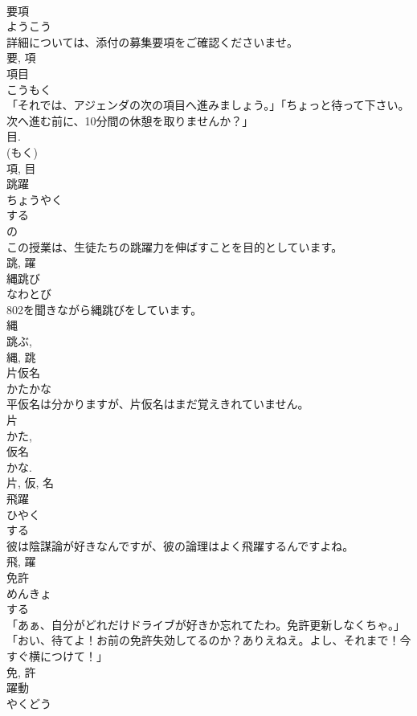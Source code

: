\documentclass[8pt]{extreport}
\begin{document}
\begin{CJK}{UTF8}{min}
\\	要項	
\\	ようこう	
\\	詳細については、添付の募集要項をご確認くださいませ。	
\\	要, 項	
\\	項目	
\\	こうもく	
\\	「それでは、アジェンダの次の項目へ進みましょう。」「ちょっと待って下さい。次へ進む前に、10分間の休憩を取りませんか？」	
\\	目. 
\\	(もく) 
\\	項, 目	
\\	跳躍	
\\	ちょうやく	
\\	する 
\\	の 
\\	この授業は、生徒たちの跳躍力を伸ばすことを目的としています。	
\\	跳, 躍	
\\	縄跳び	
\\	なわとび	
\\	802を聞きながら縄跳びをしています。	
\\	縄 
\\	跳ぶ, 
\\	縄, 跳	
\\	片仮名	
\\	かたかな	
\\	平仮名は分かりますが、片仮名はまだ覚えきれていません。	
\\	片 
\\	かた, 
\\	仮名 
\\	かな. 
\\	片, 仮, 名	
\\	飛躍	
\\	ひやく	
\\	する 
\\	彼は陰謀論が好きなんですが、彼の論理はよく飛躍するんですよね。	
\\	飛, 躍	
\\	免許	
\\	めんきょ	
\\	する 
\\	「あぁ、自分がどれだけドライブが好きか忘れてたわ。免許更新しなくちゃ。」「おい、待てよ！お前の免許失効してるのか？ありえねえ。よし、それまで！今すぐ横につけて！」	
\\	免, 許	
\\	躍動	
\\	やくどう	

\end{CJK}
\end{document}
